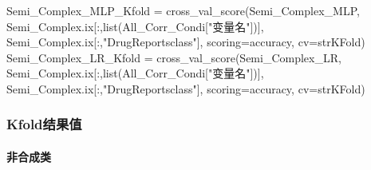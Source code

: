 \documentclass[
]{article}
\newenvironment{Shaded}{}{}
\newcommand{\BuiltInTok}[1]{#1}
\newcommand{\NormalTok}[1]{#1}
\newcommand{\OperatorTok}[1]{\textcolor[rgb]{0.40,0.40,0.40}{#1}}
\newcommand{\StringTok}[1]{\textcolor[rgb]{0.25,0.44,0.63}{#1}}
\begin{document}
\begin{Shaded}
\begin{Highlighting}[]
\NormalTok{Semi\_Complex\_MLP\_Kfold }\OperatorTok{=}\NormalTok{ cross\_val\_score(Semi\_Complex\_MLP,}
\NormalTok{                            Semi\_Complex.ix[:,}\BuiltInTok{list}\NormalTok{(All\_Corr\_Condi[}\StringTok{"变量名"}\NormalTok{])],}
\NormalTok{                            Semi\_Complex.ix[:,}\StringTok{"DrugReportsclass"}\NormalTok{],}
\NormalTok{                            scoring}\OperatorTok{=}\StringTok{\textquotesingle{}accuracy\textquotesingle{}}\NormalTok{,}
\NormalTok{                            cv}\OperatorTok{=}\NormalTok{strKFold)}
\NormalTok{Semi\_Complex\_LR\_Kfold }\OperatorTok{=}\NormalTok{ cross\_val\_score(Semi\_Complex\_LR,}
\NormalTok{                            Semi\_Complex.ix[:,}\BuiltInTok{list}\NormalTok{(All\_Corr\_Condi[}\StringTok{"变量名"}\NormalTok{])],}
\NormalTok{                            Semi\_Complex.ix[:,}\StringTok{"DrugReportsclass"}\NormalTok{],}
\NormalTok{                            scoring}\OperatorTok{=}\StringTok{\textquotesingle{}accuracy\textquotesingle{}}\NormalTok{,}
\NormalTok{                            cv}\OperatorTok{=}\NormalTok{strKFold)}
\end{Highlighting}
\end{Shaded}

\hypertarget{header-n328}{%
\subsubsection{Kfold结果值}\label{header-n328}}

\hypertarget{header-n329}{%
\paragraph{非合成类}\label{header-n329}}
\end{document}
